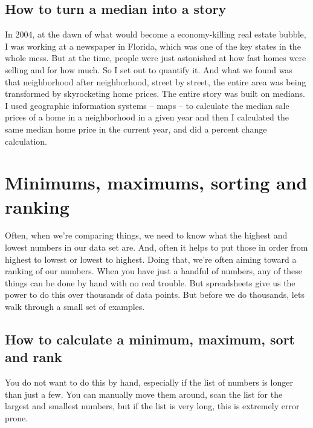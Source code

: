\documentclass[]{book}
\begin{document}
\hypertarget{how-to-turn-a-median-into-a-story}{%
\section{How to turn a median into a story}\label{how-to-turn-a-median-into-a-story}}

In 2004, at the dawn of what would become a economy-killing real estate bubble, I was working at a newspaper in Florida, which was one of the key states in the whole mess. But at the time, people were just astonished at how fast homes were selling and for how much. So I set out to quantify it. And what we found was that neighborhood after neighborhood, street by street, the entire area was being transformed by skyrocketing home prices. The entire story was built on medians. I used geographic information systems -- maps -- to calculate the median sale prices of a home in a neighborhood in a given year and then I calculated the same median home price in the current year, and did a percent change calculation.

\hypertarget{minimums-maximums-sorting-and-ranking}{%
\chapter{Minimums, maximums, sorting and ranking}\label{minimums-maximums-sorting-and-ranking}}

Often, when we're comparing things, we need to know what the highest and lowest numbers in our data set are. And, often it helps to put those in order from highest to lowest or lowest to highest. Doing that, we're often aiming toward a ranking of our numbers. When you have just a handful of numbers, any of these things can be done by hand with no real trouble. But spreadsheets give us the power to do this over thousands of data points. But before we do thousands, lets walk through a small set of examples.

\hypertarget{how-to-calculate-a-minimum-maximum-sort-and-rank}{%
\section{How to calculate a minimum, maximum, sort and rank}\label{how-to-calculate-a-minimum-maximum-sort-and-rank}}

You do not want to do this by hand, especially if the list of numbers is longer than just a few. You can manually move them around, scan the list for the largest and smallest numbers, but if the list is very long, this is extremely error prone.
\end{document}
